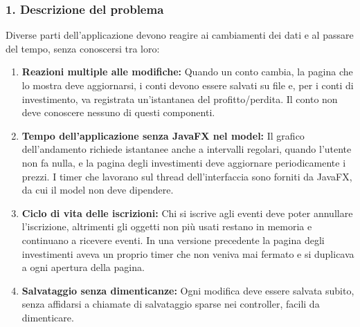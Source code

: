 \documentclass[11pt,a4paper,openright]{report}
\begin{document}
\subsubsection*{1. Descrizione del problema}
Diverse parti dell'applicazione devono reagire ai cambiamenti dei dati e al passare del tempo, senza conoscersi tra loro:
\begin{enumerate}
    \item \textbf{Reazioni multiple alle modifiche:} Quando un conto cambia, la pagina che lo mostra deve aggiornarsi, i conti devono essere salvati su file e, per i conti di investimento, va registrata un'istantanea del profitto/perdita. Il conto non deve conoscere nessuno di questi componenti.
    \item \textbf{Tempo dell'applicazione senza JavaFX nel model:} Il grafico dell'andamento richiede istantanee anche a intervalli regolari, quando l'utente non fa nulla, e la pagina degli investimenti deve aggiornare periodicamente i prezzi. I timer che lavorano sul thread dell'interfaccia sono forniti da JavaFX, da cui il model non deve dipendere.
    \item \textbf{Ciclo di vita delle iscrizioni:} Chi si iscrive agli eventi deve poter annullare l'iscrizione, altrimenti gli oggetti non più usati restano in memoria e continuano a ricevere eventi. In una versione precedente la pagina degli investimenti aveva un proprio timer che non veniva mai fermato e si duplicava a ogni apertura della pagina.
    \item \textbf{Salvataggio senza dimenticanze:} Ogni modifica deve essere salvata subito, senza affidarsi a chiamate di salvataggio sparse nei controller, facili da dimenticare.
\end{enumerate}
\end{document}
